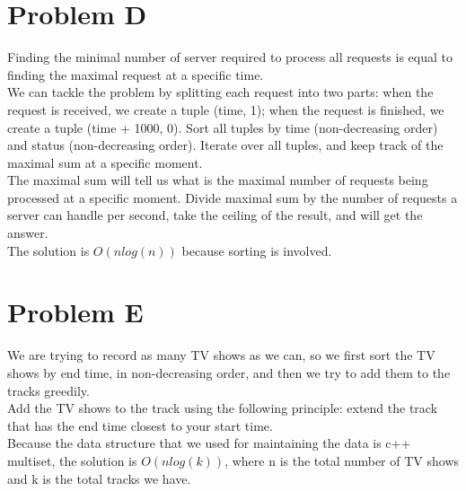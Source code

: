 \documentclass[10pt]{article}
\begin{document}


\section*{Problem D}

Finding the minimal number of server required to process all requests is equal to finding the maximal request at a specific time. \\

We can tackle the problem by splitting each request into two parts: when the request is received, we create a tuple (time, 1); when the request is finished, we create a tuple (time + 1000, 0). Sort all tuples by time (non-decreasing order) and status (non-decreasing order). Iterate over all tuples, and keep track of the maximal sum at a specific moment. \\

The maximal sum will tell us what is the maximal number of requests being processed at a specific moment. Divide maximal sum by the number of requests a server can handle per second, take the ceiling of the result, and will get the answer.\\

The solution is $O(nlog(n))$ because sorting is involved.\\



\newpage



\section*{Problem E}

We are trying to record as many TV shows as we can, so we first sort the TV shows by end time, in non-decreasing order, and then we try to add them to the tracks greedily.\\

Add the TV shows to the track using the following principle: extend the track that has the end time closest to your start time. \\

Because the data structure that we used for maintaining the data is c++ multiset, the solution is $O(nlog(k))$, where n is the total number of TV shows and k is the total tracks we have. \\
\end{document}
